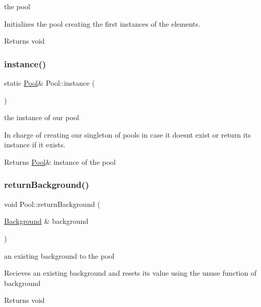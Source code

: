 the pool

Initializes the pool creating the first instances of the elements.

\begin{DoxyReturn}{Returns}
void 
\end{DoxyReturn}
\mbox{\label{class_pool_a20e44e0054d4eedf57f1943b87c06e20}} 
\subsubsection{\texorpdfstring{instance()}{instance()}}
{\footnotesize\ttfamily static \hyperlink{class_pool}{Pool}\& Pool\+::instance (\begin{DoxyParamCaption}{ }\end{DoxyParamCaption})\hspace{0.3cm}{\ttfamily [static]}}

the instance of our pool

In charge of creating our singleton of pools in case it doesn\textquotesingle{}t exist or return it\textquotesingle{}s instance if it exists.

\begin{DoxyReturn}{Returns}
\hyperlink{class_pool}{Pool}\& instance of the pool 
\end{DoxyReturn}
\mbox{\label{class_pool_af6234b218a3dd72a440a3381b35c9e36}} 
\subsubsection{\texorpdfstring{return\+Background()}{returnBackground()}}
{\footnotesize\ttfamily void Pool\+::return\+Background (\begin{DoxyParamCaption}\item[{\hyperlink{class_background}{Background} \&}]{background }\end{DoxyParamCaption})}

an existing background to the pool

Recieves an existing background and resets it\textquotesingle{}s value using the unuse function of background

\begin{DoxyReturn}{Returns}
void 
\end{DoxyReturn}
\mbox{\label{class_pool_a2a38a2d1aa883152d27fa213ac2cc2e8}} 
